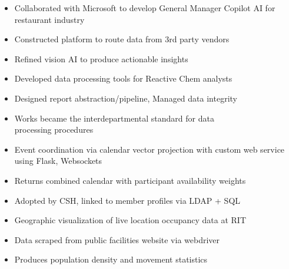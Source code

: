 \documentclass[10pt,a4paper,ragged2e,withhyper]{altacv}
\begin{document}
\begin{paracol}{2}


\begin{itemize}
    \item Collaborated with Microsoft to develop General Manager Copilot AI for restaurant industry
    \item Constructed platform to route data from 3rd party vendors
    \item Refined vision AI to produce actionable insights
\end{itemize}

\divider

\begin{itemize}
    \item Developed data processing tools for Reactive Chem analysts
    \item Designed report abstraction/pipeline, Managed data integrity
    \item Works became the interdepartmental standard for data\\processing procedures
\end{itemize}


\begin{itemize}
    \item Event coordination via calendar vector projection with custom web service using Flask, Websockets
    \item Returns combined calendar with participant availability weights
    \item Adopted by CSH, linked to member profiles via LDAP + SQL
\end{itemize}

\divider

\begin{itemize}
    \item Geographic visualization of live location occupancy data at RIT
    \item Data scraped from public facilities website via webdriver
    \item Produces population density and movement statistics
\end{itemize}


\end{paracol}
\end{document}
